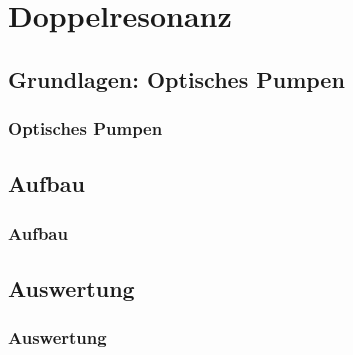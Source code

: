 \section{Doppelresonanz}
\subsection{Grundlagen: Optisches Pumpen}
\begin{frame}
\frametitle{Optisches Pumpen}
  
\end{frame}

\subsection{Aufbau}
\begin{frame}
\frametitle{Aufbau}
  
\end{frame}

\subsection{Auswertung}
\begin{frame}
\frametitle{Auswertung}
  
\end{frame}